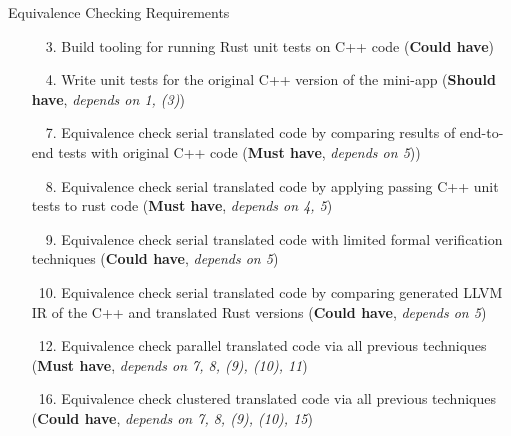 \documentclass[10pt,aspectratio=169]{beamer}
\newcommand{\cmark}{\ding{51}}
\newcommand{\xmark}{\ding{55}}
\newcommand{\done}{\rlap{$\square$}{\raisebox{2pt}{\large\hspace{1pt}\textcolor{green}{\cmark}}}\hspace{-2.5pt}}
\newcommand{\wontfix}{\rlap{$\square$}{\large\hspace{1pt}\textcolor{red}{\xmark}}}
\newcommand{\partialdone}{\rlap{$\square$}{\raisebox{2pt}{\large\hspace{1pt}\textcolor{orange}{\cmark}}}\hspace{-2.5pt}}
\begin{document}
\begin{frame}{Equivalence Checking Requirements}
    \begin{itemize}
        \item[\done\ \ 3.]
          Build tooling for running Rust unit tests on C++ code
          (\textbf{Could have})
        \item[\done\ \ 4.]
          Write unit tests for the original C++ version of the
          mini-app
          (\textbf{Should have}, \textit{depends on 1, (3)})
        \item[\done\ \ 7.]
          Equivalence check serial translated code by comparing results of end-to-end tests with original C++ code
          (\textbf{Must have}, \textit{depends on 5}))
        \item[\done\ \ 8.]
          Equivalence check serial translated code by applying passing C++ unit tests to rust code
          (\textbf{Must have}, \textit{depends on 4, 5})
        \item[\wontfix\ \ 9.]
          Equivalence check serial translated code with limited formal verification techniques
          (\textbf{Could have}, \textit{depends on 5})
        \item[\partialdone\ 10.]
          Equivalence check serial translated code by comparing generated LLVM IR of the C++ and translated Rust versions
          (\textbf{Could have}, \textit{depends on 5})
        \item[\done\ 12.]
          Equivalence check parallel translated code via all previous techniques
          (\textbf{Must have}, \textit{depends on 7, 8, (9), (10), 11})
        \item[\done\ 16.]
          Equivalence check clustered translated code via all previous techniques
          (\textbf{Could have}, \textit{depends on 7, 8, (9), (10), 15})
    \end{itemize}
\end{frame}
\end{document}
